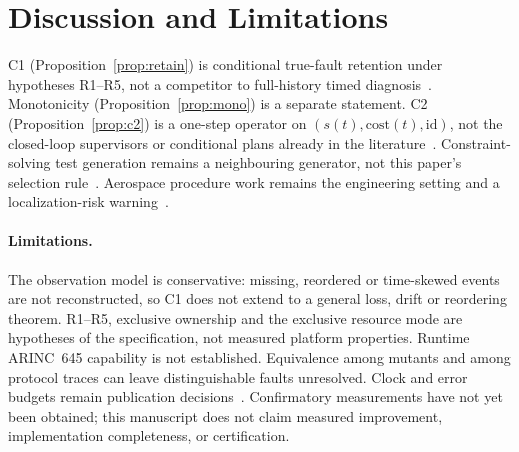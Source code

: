 \section{Discussion and Limitations}
\label{sec:disc}

C1 (Proposition~\ref{prop:retain}) is conditional true-fault retention under
hypotheses R1--R5, not a competitor to full-history timed
diagnosis~\cite{koehl2023}. Monotonicity (Proposition~\ref{prop:mono}) is a
separate statement. C2 (Proposition~\ref{prop:c2}) is a one-step operator on
\((s(t),\mathrm{cost}(t),\mathrm{id})\), not the closed-loop supervisors or
conditional plans already in the
literature~\cite{sampath1998,chanthery2009,hu2020,miao2025}. Constraint-solving
test generation remains a neighbouring generator, not this paper's selection
rule~\cite{petrenko2016}. Aerospace procedure work remains the engineering
setting and a localization-risk warning~\cite{chanthery2019}.


\paragraph{Limitations.}
The observation model is conservative: missing, reordered or time-skewed
events are not reconstructed, so C1 does not extend to a general loss, drift
or reordering theorem. R1--R5, exclusive ownership and the exclusive resource
mode are hypotheses of the specification, not measured platform properties.
Runtime ARINC~645 capability is not established. Equivalence among mutants and
among protocol traces can leave distinguishable faults unresolved. Clock and
error budgets remain publication decisions~\cite{jcgm100,jcgm106}.
Confirmatory measurements have not yet been obtained; this manuscript does
not claim measured improvement, implementation completeness, or certification.
